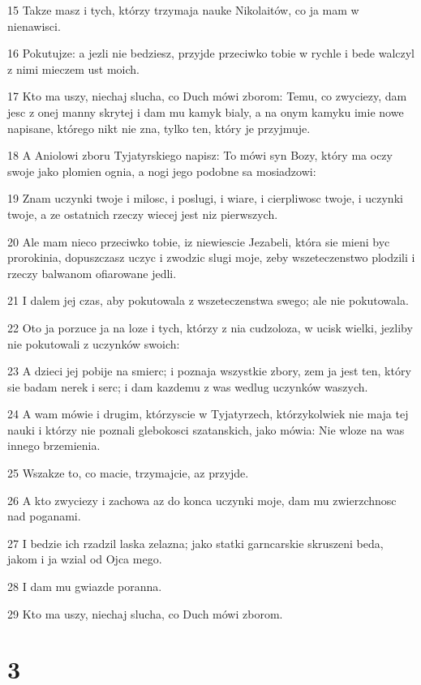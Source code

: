 \par 15 Takze masz i tych, którzy trzymaja nauke Nikolaitów, co ja mam w nienawisci.
\par 16 Pokutujze: a jezli nie bedziesz, przyjde przeciwko tobie w rychle i bede walczyl z nimi mieczem ust moich.
\par 17 Kto ma uszy, niechaj slucha, co Duch mówi zborom: Temu, co zwyciezy, dam jesc z onej manny skrytej i dam mu kamyk bialy, a na onym kamyku imie nowe napisane, którego nikt nie zna, tylko ten, który je przyjmuje.
\par 18 A Aniolowi zboru Tyjatyrskiego napisz: To mówi syn Bozy, który ma oczy swoje jako plomien ognia, a nogi jego podobne sa mosiadzowi:
\par 19 Znam uczynki twoje i milosc, i poslugi, i wiare, i cierpliwosc twoje, i uczynki twoje, a ze ostatnich rzeczy wiecej jest niz pierwszych.
\par 20 Ale mam nieco przeciwko tobie, iz niewiescie Jezabeli, która sie mieni byc prorokinia, dopuszczasz uczyc i zwodzic slugi moje, zeby wszeteczenstwo plodzili i rzeczy balwanom ofiarowane jedli.
\par 21 I dalem jej czas, aby pokutowala z wszeteczenstwa swego; ale nie pokutowala.
\par 22 Oto ja porzuce ja na loze i tych, którzy z nia cudzoloza, w ucisk wielki, jezliby nie pokutowali z uczynków swoich:
\par 23 A dzieci jej pobije na smierc; i poznaja wszystkie zbory, zem ja jest ten, który sie badam nerek i serc; i dam kazdemu z was wedlug uczynków waszych.
\par 24 A wam mówie i drugim, którzyscie w Tyjatyrzech, którzykolwiek nie maja tej nauki i którzy nie poznali glebokosci szatanskich, jako mówia: Nie wloze na was innego brzemienia.
\par 25 Wszakze to, co macie, trzymajcie, az przyjde.
\par 26 A kto zwyciezy i zachowa az do konca uczynki moje, dam mu zwierzchnosc nad poganami.
\par 27 I bedzie ich rzadzil laska zelazna; jako statki garncarskie skruszeni beda, jakom i ja wzial od Ojca mego.
\par 28 I dam mu gwiazde poranna.
\par 29 Kto ma uszy, niechaj slucha, co Duch mówi zborom.

\chapter{3}

